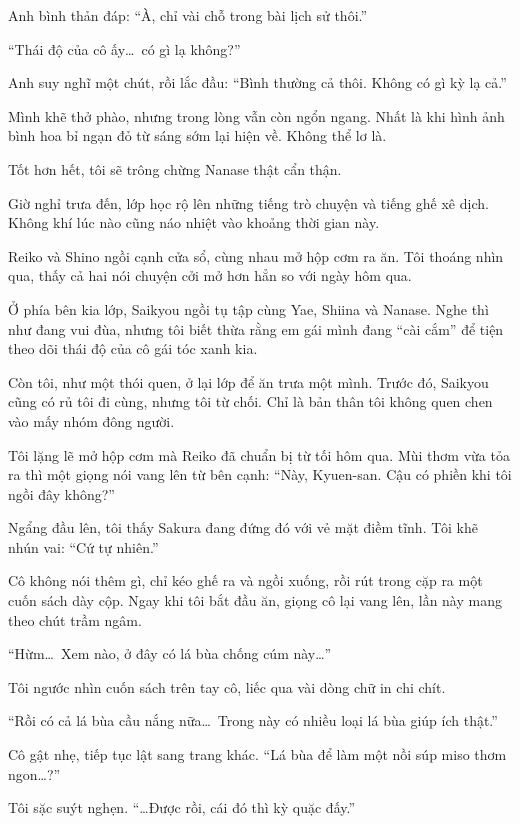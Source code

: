 \documentclass[../main.tex]{subfiles}
\begin{document}
Anh bình thản đáp: ``À, chỉ vài chỗ trong bài lịch sử thôi.''

``Thái độ của cô ấy\dots\ có gì lạ không?''

Anh suy nghĩ một chút, rồi lắc đầu: ``Bình thường cả thôi. Không có gì kỳ lạ cả.''

Mình khẽ thở phào, nhưng trong lòng vẫn còn ngổn ngang. Nhất là khi hình ảnh bình hoa bỉ ngạn đỏ từ sáng sớm lại hiện về. Không thể lơ là.

Tốt hơn hết, tôi sẽ trông chừng Nanase thật cẩn thận.


Giờ nghỉ trưa đến, lớp học rộ lên những tiếng trò chuyện và tiếng ghế xê dịch. Không khí lúc nào cũng náo nhiệt vào khoảng thời gian này.

Reiko và Shino ngồi cạnh cửa sổ, cùng nhau mở hộp cơm ra ăn. Tôi thoáng nhìn qua, thấy cả hai nói chuyện cởi mở hơn hẳn so với ngày hôm qua.

Ở phía bên kia lớp, Saikyou ngồi tụ tập cùng Yae, Shiina và Nanase. Nghe thì như đang vui đùa, nhưng tôi biết thừa rằng em gái mình đang ``cài cắm'' để tiện theo dõi thái độ của cô gái tóc xanh kia.

Còn tôi, như một thói quen, ở lại lớp để ăn trưa một mình. Trước đó, Saikyou cũng có rủ tôi đi cùng, nhưng tôi từ chối. Chỉ là bản thân tôi không quen chen vào mấy nhóm đông người.

Tôi lặng lẽ mở hộp cơm mà Reiko đã chuẩn bị từ tối hôm qua. Mùi thơm vừa tỏa ra thì một giọng nói vang lên từ bên cạnh: ``Này, Kyuen-san. Cậu có phiền khi tôi ngồi đây không?''

Ngẩng đầu lên, tôi thấy Sakura đang đứng đó với vẻ mặt điềm tĩnh. Tôi khẽ nhún vai: ``Cứ tự nhiên.''

Cô không nói thêm gì, chỉ kéo ghế ra và ngồi xuống, rồi rút trong cặp ra một cuốn sách dày cộp. Ngay khi tôi bắt đầu ăn, giọng cô lại vang lên, lần này mang theo chút trầm ngâm.

``Hừm\dots\ Xem nào, ở đây có lá bùa chống cúm này\dots''

Tôi ngước nhìn cuốn sách trên tay cô, liếc qua vài dòng chữ in chi chít.

``Rồi có cả lá bùa cầu nắng nữa\dots\ Trong này có nhiều loại lá bùa giúp ích thật.''

Cô gật nhẹ, tiếp tục lật sang trang khác. ``Lá bùa để làm một nồi súp miso thơm ngon\dots?''

Tôi sặc suýt nghẹn. ``\dots Được rồi, cái đó thì kỳ quặc đấy.''
\end{document}
